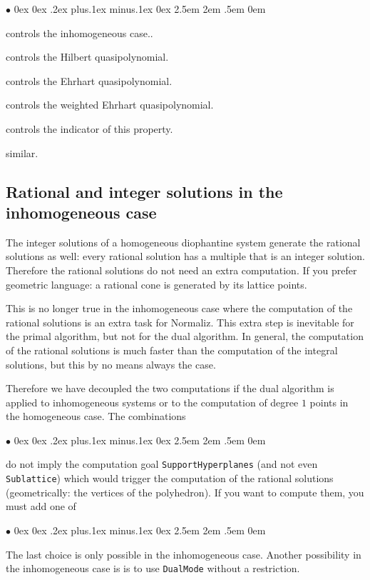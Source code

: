 \documentclass[12pt,a4paper]{scrartcl}
\newcommand{\stdli}{ \topsep0ex \partopsep0ex %
\parsep.2ex plus.1ex minus.1ex \itemsep0ex%
\leftmargin2.5em \labelwidth2em \labelsep.5em \rightmargin0em}%
\renewenvironment{itemize}{\begin{list}{{$\bullet$}}{\stdli}}{\end{list}}
\theoremstyle{definition}
\def\itemtt[#1]{\item[\textbf{\ttt{#1}}]}
\def\ttt{\texttt}
\begin{document}
\begin{itemize}
	
	\itemtt[IsInhomogeneous] controls the inhomogeneous case..
	
	\itemtt[HilbertQuasiPolynomial] controls the Hilbert quasipolynomial.
   \itemtt[EhrhartQuasiPolynomial] controls the Ehrhart quasipolynomial.
	
	\itemtt[WeightedEhrhartQuasiPolynomial] controls the weighted Ehrhart quasipolynomial.
	
	\itemtt[IsTriangulationNested]  controls the indicator of this property.
	\itemtt[IsTriangulationPartial]  similar.
	
\end{itemize}

\subsection{Rational and integer solutions in the inhomogeneous case}\label{InhomDual}

The integer solutions of a homogeneous diophantine system generate the rational solutions as well: every rational solution has a multiple that is an integer solution. Therefore the rational solutions do not need an extra computation. If you prefer geometric language: a rational cone is generated by its lattice points.

This is no longer true in the inhomogeneous case where the computation of the rational solutions is an extra task for Normaliz. This extra step is inevitable for the primal algorithm, but not for the dual algorithm. In general, the computation of the rational solutions is much faster than the computation of the integral solutions, but this by no means always the case. 

Therefore we have decoupled the two computations if the dual algorithm is applied to inhomogeneous systems or to the computation of degree $1$ points in the homogeneous case. The combinations
\begin{itemize}
\itemtt [DualMode HilbertBasis, -dN]

\itemtt [DualMode Deg1Elements, -d1]

\itemtt [DualMode ModuleGenerators]

\itemtt [DualMode LatticePoints]

\end{itemize}
do not imply the computation goal \verb|SupportHyperplanes| (and not even \verb|Sublattice|) which would trigger the computation of the rational solutions (geometrically: the vertices of the polyhedron). If you want to compute them, you must add one of
\begin{itemize}
\itemtt[SupportHyperplanes, -s]

\itemtt[ExtremeRays]

\itemtt[VerticesOfPolyhedron]
\end{itemize} 
The last choice is only possible in the inhomogeneous case. Another possibility in the inhomogeneous case is is to use \verb|DualMode| without a restriction.
\end{document}
